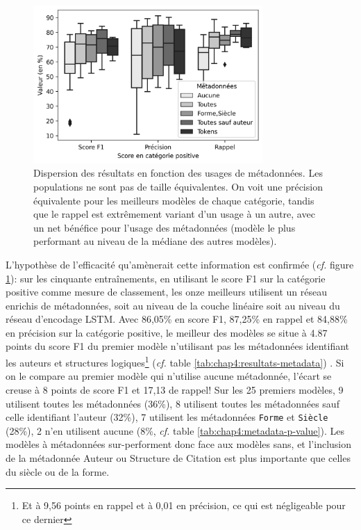 \begin{figure}[ht]
    \centering
    \includegraphics[height=6cm]{figures/chap4/scoreMetadata.png}
    \caption{Dispersion des résultats en fonction des usages de métadonnées. Les populations ne sont pas de taille équivalentes. On voit une précision équivalente pour les meilleurs modèles de chaque catégorie, tandis que le rappel est extrêmement variant d'un usage à un autre, avec un net bénéfice pour l'usage des métadonnées (modèle le plus performant au niveau de la médiane des autres modèles).}
    \label{fig:chap4:metadata-boxplot}
\end{figure}

L'hypothèse de l'efficacité qu'amènerait cette information est confirmée (\textit{cf.} figure \ref{fig:chap4:metadata-boxplot}): sur les cinquante entraînements, en utilisant le score F1 sur la catégorie positive comme mesure de classement, les onze meilleurs utilisent un réseau enrichis de métadonnées, soit au niveau de la couche linéaire soit au niveau du réseau d'encodage LSTM. Avec 86,05\% en score F1, 87,25\% en rappel et 84,88\% en précision sur la catégorie positive, le meilleur des modèles se situe à 4.87 points du score F1 du premier modèle n'utilisant pas les métadonnées identifiant les auteurs et structures logiques\footnote{Et à 9,56 points en rappel et à 0,01 en précision, ce qui est négligeable pour ce dernier} (\textit{cf.} table \ref{tab:chap4:resultats-metadata}) . Si on le compare au premier modèle qui n'utilise aucune métadonnée, l'écart se creuse à 8 points de score F1 et 17,13 de rappel! Sur les 25 premiers modèles, 9 utilisent toutes les métadonnées (36\%), 8 utilisent toutes les métadonnées sauf celle identifiant l'auteur (32\%), 7 utilisent les métadonnées \texttt{Forme} et \texttt{Siècle} (28\%), 2 n'en utilisent aucune (8\%, \textit{cf.} table \ref{tab:chap4:metadata-p-value}). Les modèles à métadonnées sur-performent donc face aux modèles sans, et l'inclusion de la métadonnée Auteur ou Structure de Citation est plus importante que celles du siècle ou de la forme.

